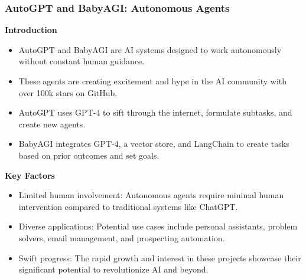 \begin{frame}[fragile]
\frametitle{AutoGPT and BabyAGI: Autonomous Agents}

\textbf{Introduction}
\begin{itemize}
    \item AutoGPT and BabyAGI are AI systems designed to work autonomously without constant human guidance.
    \item These agents are creating excitement and hype in the AI community with over 100k stars on GitHub.
    \item AutoGPT uses GPT-4 to sift through the internet, formulate subtasks, and create new agents.
    \item BabyAGI integrates GPT-4, a vector store, and LangChain to create tasks based on prior outcomes and set goals.
\end{itemize}

\textbf{Key Factors}
\begin{itemize}
    \item Limited human involvement: Autonomous agents require minimal human intervention compared to traditional systems like ChatGPT.
    \item Diverse applications: Potential use cases include personal assistants, problem solvers, email management, and prospecting automation.
    \item Swift progress: The rapid growth and interest in these projects showcase their significant potential to revolutionize AI and beyond.
\end{itemize}

\end{frame}


